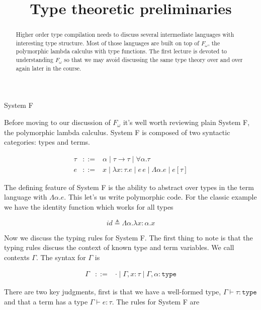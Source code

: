 \documentclass{amsart}
\title{Type theoretic preliminaries}
\newcommand{\type}{\ensuremath{\mathtt{type}}}
\begin{document}
\maketitle

\begin{abstract}
  Higher order type compilation needs to discuss several intermediate languages with interesting type structure. Most of those languages are built on top
  of $F_\omega$, the polymorphic lambda calculus with type
  functions. The first lecture is devoted to understanding $F_\omega$
  so that we may avoid discussing the same type theory over and over
  again later in the course.
\end{abstract}

\begin{section}{System F}

Before moving to our discussion of $F_\omega$ it's well worth
reviewing plain System F, the polymorphic lambda calculus. System F is
composed of two syntactic categories: types and terms.

\[
\begin{array}{lcl}
  \tau & ::= & \alpha \mid \tau \to \tau \mid \forall \alpha. \tau\\
  e & ::= & x \mid \lambda x : \tau. e \mid e \, e \mid
            \Lambda \alpha. e \mid e[\tau]
\end{array}
\]

The defining feature of System F is the ability to abstract over types
in the term language with $\Lambda \alpha. e$. This let's us write
polymorphic code. For the classic example we have the identity
function which works for all types

\[
  id \triangleq \Lambda \alpha. \lambda x : \alpha. x
\]

Now we discuss the typing rules for System F. The first thing to note
is that the typing rules discuss the context of known type and term
variables. We call contexts $\Gamma$. The syntax for $\Gamma$ is

\[
\begin{array}{lcl}
  \Gamma & ::= & \cdot \mid \Gamma, x : \tau \mid \Gamma, \alpha : \type
\end{array}
\]

There are two key
judgments, first is that we have a well-formed type, $\Gamma \vdash
\tau : \type$ and that a term has a type $\Gamma \vdash e : \tau$. The
rules for System F are


\end{section}
\end{document}
